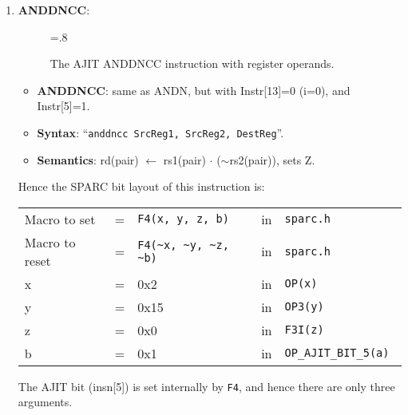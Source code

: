 \begin{enumerate}
\item \textbf{ANDDNCC}:\\
  \begin{center}
    \begin{figure}[h]
      \centering
      \epsfxsize=.8\linewidth
      \caption{The AJIT ANDDNCC instruction  with register operands.}
      \label{fig:ajit:anddncc:insn}
    \end{figure}
  \end{center}
  \begin{itemize}
  \item []\textbf{ANDDNCC}: same as ANDN, but with Instr[13]=0 (i=0), and
    Instr[5]=1.
  \item []\textbf{Syntax}: ``\texttt{anddncc  SrcReg1, SrcReg2, DestReg}''.
  \item []\textbf{Semantics}: rd(pair) $\leftarrow$ rs1(pair) $\cdot$
    ($\sim$rs2(pair)), sets Z.
  \end{itemize}

  Hence the SPARC bit layout of this instruction is:

  \begin{tabular}[h]{lclcl}
    Macro to set   &=&  \verb|F4(x, y, z, b)|     &in& \verb|sparc.h|     \\
    Macro to reset &=&  \verb|F4(~x, ~y, ~z, ~b)| &in& \verb|sparc.h|     \\
    x              &=& 0x2                        &in& \verb|OP(x) | \\
    y              &=& 0x15                       &in& \verb|OP3(y) | \\
    z              &=& 0x0                        &in& \verb|F3I(z) | \\
    b              &=& 0x1                        &in& \verb|OP_AJIT_BIT_5(a) |
  \end{tabular}

  The AJIT bit  (insn[5]) is set internally by  \texttt{F4}, and hence
  there are only three arguments.

\end{enumerate}

